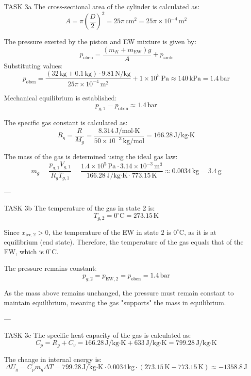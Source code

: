 TASK 3a  
The cross-sectional area of the cylinder is calculated as:  
\[
A = \pi \left( \frac{D}{2} \right)^2 = 25 \pi \, \text{cm}^2 = 25 \pi \times 10^{-4} \, \text{m}^2
\]  

The pressure exerted by the piston and EW mixture is given by:  
\[
p_{\text{oben}} = \frac{(m_K + m_{\text{EW}}) g}{A} + p_{\text{amb}}
\]  
Substituting values:  
\[
p_{\text{oben}} = \frac{(32 \, \text{kg} + 0.1 \, \text{kg}) \cdot 9.81 \, \text{N/kg}}{25 \pi \times 10^{-4} \, \text{m}^2} + 1 \times 10^5 \, \text{Pa} \approx 140 \, \text{kPa} = 1.4 \, \text{bar}
\]  

Mechanical equilibrium is established:  
\[
p_{g,1} = p_{\text{oben}} \approx 1.4 \, \text{bar}
\]  

The specific gas constant is calculated as:  
\[
R_g = \frac{R}{M_g} = \frac{8.314 \, \text{J/mol·K}}{50 \times 10^{-3} \, \text{kg/mol}} = 166.28 \, \text{J/kg·K}
\]  

The mass of the gas is determined using the ideal gas law:  
\[
m_g = \frac{p_{g,1} V_{g,1}}{R_g T_{g,1}} = \frac{1.4 \times 10^5 \, \text{Pa} \cdot 3.14 \times 10^{-3} \, \text{m}^3}{166.28 \, \text{J/kg·K} \cdot 773.15 \, \text{K}} \approx 0.0034 \, \text{kg} = 3.4 \, \text{g}
\]  

---

TASK 3b  
The temperature of the gas in state 2 is:  
\[
T_{g,2} = 0^\circ \text{C} = 273.15 \, \text{K}
\]  

Since \( x_{\text{ice},2} > 0 \), the temperature of the EW in state 2 is \( 0^\circ \text{C} \), as it is at equilibrium (end state). Therefore, the temperature of the gas equals that of the EW, which is \( 0^\circ \text{C} \).  

The pressure remains constant:  
\[
p_{g,2} = p_{\text{EW},2} = p_{\text{oben}} = 1.4 \, \text{bar}
\]  

As the mass above remains unchanged, the pressure must remain constant to maintain equilibrium, meaning the gas "supports" the mass in equilibrium.

---

TASK 3c  
The specific heat capacity of the gas is calculated as:  
\[
C_p = R_g + C_v = 166.28 \, \text{J/kg·K} + 633 \, \text{J/kg·K} = 799.28 \, \text{J/kg·K}
\]  

The change in internal energy is:  
\[
\Delta U_g = C_p m_g \Delta T = 799.28 \, \text{J/kg·K} \cdot 0.0034 \, \text{kg} \cdot (273.15 \, \text{K} - 773.15 \, \text{K}) \approx -1358.8 \, \text{J}
\]  

